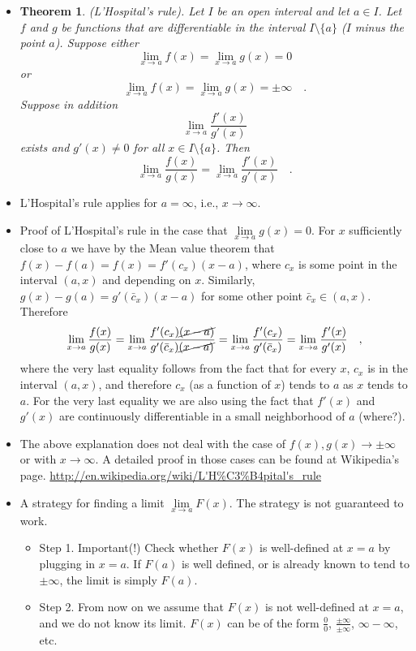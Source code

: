 \documentclass[12pt]{book}
\newtheorem{theorem}{Theorem}[section]
\begin{document}
\begin{itemize}
\item 
\begin{theorem} 
(L'Hospital's rule). Let $I$ be an open interval and let $a\in I$. Let $f$ and $g$ be functions that are differentiable in the interval $I\setminus \{a\}$ ($I$ minus the point $a$). Suppose either
\[
\lim_{x\to a} f(x)= \lim_{x\to a}g(x)=0
\]
or
\[
\lim_{x\to a} f(x)= \lim_{x\to a}g(x)=\pm \infty\quad .
\]
Suppose in addition 
\[
\lim_{x\to a} \frac{f'(x)}{g'(x)}
\]
exists and $g'(x)\neq 0$ for all $x\in I\setminus \{a\}$. Then 
\[ 
\lim_{x\to a}\frac{f(x)}{g(x)}= \lim_{x\to a} \frac{f'(x)}{g'(x)}\quad .
\]
\end{theorem}
\item L'Hospital's rule applies for $a=\infty$, i.e., $x\to \infty$. 
\item Proof of L'Hospital's rule in the case that $\lim\limits_{x\to a}g(x)=0 $. For $x$ sufficiently close to $a$ we have by the Mean value theorem that $f(x)-f(a)=f(x)=  f'(c_x) (x-a) $, where $c_x$ is some point in the interval $(a,x)$ and depending on $x$. Similarly, $g(x)- g(a)= g'(\bar c_x)(x-a)$ for some other point $\bar c_x\in (a,x)$. Therefore 
\[\lim\limits_{x\to a}\frac{f(x)}{g(x)}=\lim\limits_{x\to a}\frac{f'(c_x) \cancel{(x-a)}}{ g'(\bar c_x)\cancel{(x-a)}} = \lim\limits_{x\to a}\frac{f'(c_x) }{ g'(\bar c_x)}=\lim\limits_{x\to a}\frac{f'(x) }{ g'(x)}\quad , \] 
where the very last equality follows from the fact that for every $x$, $c_x$ is in the interval $(a,x)$, and therefore $c_x$ (as a function of $x$) tends to $a$ as $x$ tends to $a$. For the very last equality we are also using the fact that $f'(x)$ and $g'(x)$ are continuously differentiable in a small neighborhood of $a$ (where?).
\item The above explanation does not deal with the case of $f(x), g(x)\to\pm \infty $ or with $x\to \infty$. A detailed proof in those cases can be found at Wikipedia's page.
\url{http://en.wikipedia.org/wiki/L'H%C3%B4pital's_rule}
\item A strategy for finding a limit $\lim\limits_{x\to a}F(x)$. The strategy is not guaranteed to work.
\begin{itemize}
\item Step 1. Important(!) Check whether $F(x)$ is well-defined at $x=a$ by plugging in $x=a$. If $F(a)$ is well defined, or is already known to tend to $\pm \infty$, the limit is simply $F(a)$.
\item Step 2. From now on we assume that $F(x)$ is not well-defined at $x=a$, and we do not know its limit. $F(x)$ can be of the form $\frac{0}{0}$, $\frac{\pm \infty }{\pm \infty}$, $ \infty-\infty$, etc. 


\end{itemize}
\end{itemize}
\end{document}
